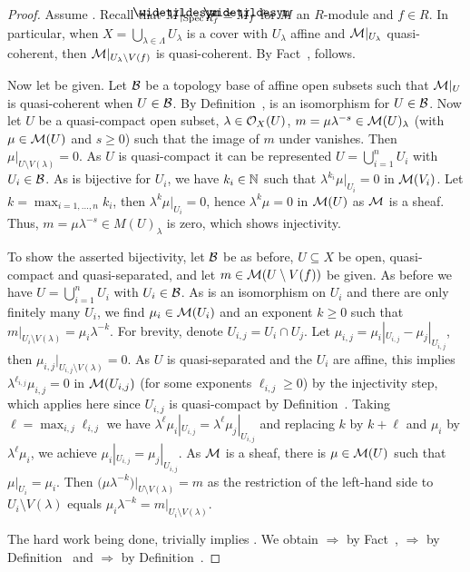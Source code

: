 \documentclass[a4paper,parskip=half,numbers=enddot, DIV=12]{scrreprt}
\begin{document}
\begin{proof}
    Assume . Recall that $\snake M|_{\Spec R_f} \cong \snake M_f$ for $M$ an $R$-module and $f\in R$. In particular, when $X = \bigcup_{\lambda\in\Lambda}U_\lambda$ is a cover with $U_\lambda$ affine and $\mathcal{M}|_{U_\lambda}$ quasi-coherent, then $\mathcal{M}|_{U_\lambda\setminus V(f)}$ is quasi-coherent. By Fact~,  follows.
    
    Now let  be given. Let $\mathcal{B}$ be a topology base of affine open subsets such that $\mathcal{M}|_U$ is quasi-coherent when $U\in\mathcal{B}$. By Definition~,  is an isomorphism for $U\in\mathcal{B}$. Now let $U$ be a quasi-compact open subset, $\lambda\in \mathcal{O}_X(U)$, $m=\mu \lambda^{-s}\in \mathcal{M}(U)_\lambda$ (with $\mu\in \mathcal{M}(U)$ and $s\geq0$) such that the image of $m$ under  vanishes. Then $\mu|_{U\setminus V(\lambda)} = 0$. As $U$ is quasi-compact it can be represented $U=\bigcup_{i=1}^n U_i$ with $U_i\in\mathcal{B}$. As  is bijective for $U_i$, we have $k_i\in\mathbb{N}$ such that $\lambda^{k_i}\mu|_{U_i}= 0$ in $\mathcal{M}(V_i)$. Let $k=\max_{i=1,\ldots,n} k_i$, then $\lambda^k\mu|_{U_i} = 0$, hence $\lambda^k\mu = 0$ in $\mathcal{M}(U)$ as $\mathcal{M}$ is a sheaf. Thus, $m = \mu \lambda^{-s}\in M(U)_\lambda$ is zero, which shows injectivity.
    
    To show the asserted bijectivity, let $\mathcal{B}$ be as before, $U\subseteq X$ be open, quasi-compact and quasi-separated, and let $m\in \mathcal{M}(U\setminus V(f))$ be given. As before we have $U=\bigcup_{i=1}^n U_i$ with $U_i\in\mathcal{B}$. As  is an isomorphism on $U_i$ and there are only finitely many $U_i$, we find $\mu_i\in\mathcal{M}(U_i)$ and an exponent $k\geq0$ such that $m|_{U_i\setminus V(\lambda)} = \mu_i\lambda^{-k}$. For brevity, denote $U_{i,j}=U_i\cap U_j$. Let $\mu_{i,j} = \mu_i|_{U_{i,j}} - \mu_j|_{U_{i,j}}$, then $\mu_{i,j}|_{U_{i,j}\setminus V(\lambda)} = 0$. As $U$ is quasi-separated and the $U_i$ are affine, this implies $\lambda^{\ell_{i,j}} \mu_{i,j} = 0$ in $\mathcal{M}(U_{i,j})$ (for some exponents $\ell_{i,j}\geq0$) by the injectivity step, which applies here since $U_{i,j}$ is quasi-compact by Definition~. Taking $\ell = \max_{i,j}\ell_{i,j}$ we have $\lambda^\ell\mu_i |_{U_{i,j}} = \lambda^\ell\mu_j|_{U_{i,j}}$ and replacing $k$ by $k+\ell$ and $\mu_i$ by $\lambda^\ell \mu_i$, we achieve $\mu_i|_{U_{i,j}} = \mu_j|_{U_{i,j}}$. As $\mathcal{M}$ is a sheaf, there is $\mu\in\mathcal{M}(U)$ such that $\mu|_{U_i} = \mu_i$. Then $\big(\mu \lambda^{-k}\big)|_{U\setminus V(\lambda)} = m$ as the restriction of the left-hand side to $U_i\setminus V(\lambda)$ equals $\mu_i\lambda^{-k} = m|_{U_i\setminus V(\lambda)}$. 
    
    The hard work being done,  trivially implies . We obtain  $\Rightarrow$  by Fact~,  $\Rightarrow$  by Definition~ and  $\Rightarrow$  by Definition~.
\end{proof}
\end{document}
